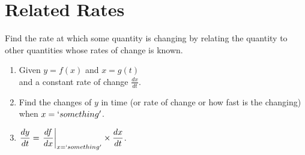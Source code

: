 \section{Related Rates}

\begin{myframe}[arc=10pt,auto outer arc]
	Find the rate at which some quantity is changing by relating the quantity to other quantities whose rates of change is known.
	
	\begin{enumerate}
	    \item Given $y = f(x)$ and $x = g(t)$ \\and a constant rate of change $\displaystyle \frac{dx}{dt}$.
		\item Find the changes of $y$ in time (or rate of change or how fast is the changing) when $x=`something'$.
		\item $\displaystyle \frac{dy}{dt} = \left. \frac{df}{dx} \right\vert_{x=`something'} \times \frac{dx}{dt}$.
	\end{enumerate}
\end{myframe}




